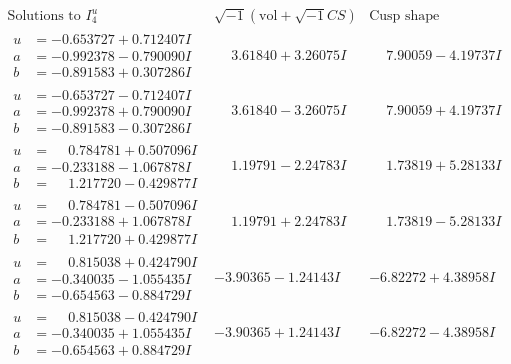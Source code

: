 \documentclass[1p]{elsarticle_modified}
\theoremstyle{definition}
\newcommand{\I}{\sqrt{-1}}
\begin{document}
$$\begin{array}{c|c|c}  
\text{Solutions to }I^u_{4}& \I (\text{vol} + \sqrt{-1}CS) & \text{Cusp shape}\\
 \hline 
\begin{aligned}
u &= -0.653727 + 0.712407 I \\
a &= -0.992378 - 0.790090 I \\
b &= -0.891583 + 0.307286 I\end{aligned}
 & \phantom{-}3.61840 + 3.26075 I & \phantom{-}7.90059 - 4.19737 I \\ \hline\begin{aligned}
u &= -0.653727 - 0.712407 I \\
a &= -0.992378 + 0.790090 I \\
b &= -0.891583 - 0.307286 I\end{aligned}
 & \phantom{-}3.61840 - 3.26075 I & \phantom{-}7.90059 + 4.19737 I \\ \hline\begin{aligned}
u &= \phantom{-}0.784781 + 0.507096 I \\
a &= -0.233188 - 1.067878 I \\
b &= \phantom{-}1.217720 - 0.429877 I\end{aligned}
 & \phantom{-}1.19791 - 2.24783 I & \phantom{-}1.73819 + 5.28133 I \\ \hline\begin{aligned}
u &= \phantom{-}0.784781 - 0.507096 I \\
a &= -0.233188 + 1.067878 I \\
b &= \phantom{-}1.217720 + 0.429877 I\end{aligned}
 & \phantom{-}1.19791 + 2.24783 I & \phantom{-}1.73819 - 5.28133 I \\ \hline\begin{aligned}
u &= \phantom{-}0.815038 + 0.424790 I \\
a &= -0.340035 - 1.055435 I \\
b &= -0.654563 - 0.884729 I\end{aligned}
 & -3.90365 - 1.24143 I & -6.82272 + 4.38958 I \\ \hline\begin{aligned}
u &= \phantom{-}0.815038 - 0.424790 I \\
a &= -0.340035 + 1.055435 I \\
b &= -0.654563 + 0.884729 I\end{aligned}
 & -3.90365 + 1.24143 I & -6.82272 - 4.38958 I \\ \hline\begin{aligned}

\end{aligned}
\end{array}$$
\end{document}
